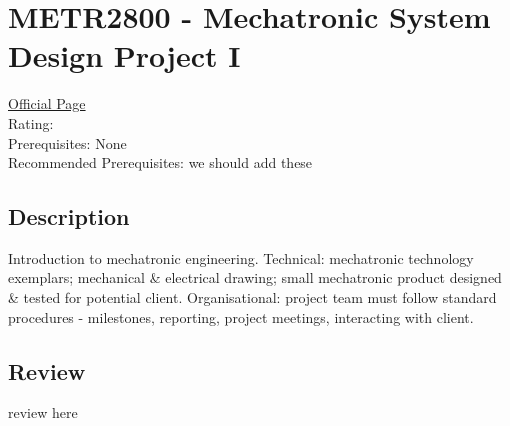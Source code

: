 \hypertarget{METR2800}{\section{METR2800 - Mechatronic System Design Project I}}

\large
\textcolor{turbo_purple}{\href{https://my.uq.edu.au/programs-courses/course.html?course_code=METR2800}{Official Page}} \\
Rating: \cstar\cstar\cstar\cstar\ostar \\
Prerequisites: None \\
Recommended Prerequisites: we should add these

\normalsize
\subsection*{Description}
Introduction to mechatronic engineering.
Technical: mechatronic technology exemplars; mechanical \& electrical drawing; small mechatronic product designed \& tested for potential client.
Organisational: project team must follow standard procedures - milestones, reporting, project meetings, interacting with client.

\subsection*{Review}
review here
